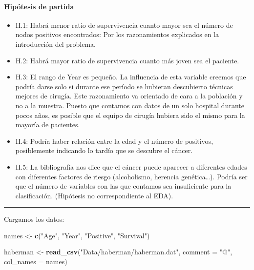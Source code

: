 \documentclass[
]{article}
\newenvironment{Shaded}{\begin{snugshade}}{\end{snugshade}}
\newcommand{\DataTypeTok}[1]{\textcolor[rgb]{0.13,0.29,0.53}{#1}}
\newcommand{\KeywordTok}[1]{\textcolor[rgb]{0.13,0.29,0.53}{\textbf{#1}}}
\newcommand{\NormalTok}[1]{#1}
\newcommand{\StringTok}[1]{\textcolor[rgb]{0.31,0.60,0.02}{#1}}
\providecommand{\tightlist}{%
  \setlength{\itemsep}{0pt}\setlength{\parskip}{0pt}}
\begin{document}
\hypertarget{hipuxf3tesis-de-partida}{%
\paragraph{Hipótesis de partida}\label{hipuxf3tesis-de-partida}}

\begin{itemize}
\tightlist
\item
  H.1: Habrá menor ratio de supervivencia cuanto mayor sea el número de
  nodos positivos encontrados: Por los razonamientos explicados en la
  introducción del problema.
\item
  H.2: Habrá mayor ratio de supervivencia cuanto más joven sea el
  paciente.
\item
  H.3: El rango de Year es pequeño. La influencia de esta variable
  creemos que podría darse solo si durante ese período se hubieran
  descubierto técnicas mejores de cirugía. Este razonamiento va
  orientado de cara a la población y no a la muestra. Puesto que
  contamos con datos de un solo hospital durante pocos años, es posible
  que el equipo de cirugía hubiera sido el mismo para la mayoría de
  pacientes.
\item
  H.4: Podría haber relación entre la edad y el número de positivos,
  posiblemente indicando lo tardío que se descubre el cáncer.
\item
  H.5: La bibliografía nos dice que el cáncer puede aparecer a
  diferentes edades con diferentes factores de riesgo (alcoholismo,
  herencia genética\ldots). Podría ser que el número de variables con
  las que contamos sea insuficiente para la clasificación. (Hipótesis no
  correspondiente al EDA).
\end{itemize}

\begin{center}\rule{0.5\linewidth}{0.5pt}\end{center}

Cargamos los datos:

\begin{Shaded}
\begin{Highlighting}[]
\NormalTok{names <-}\StringTok{ }\KeywordTok{c}\NormalTok{(}\StringTok{"Age"}\NormalTok{, }\StringTok{"Year"}\NormalTok{, }\StringTok{"Positive"}\NormalTok{, }\StringTok{"Survival"}\NormalTok{)}

\NormalTok{haberman <-}\StringTok{ }\KeywordTok{read_csv}\NormalTok{(}\StringTok{"Data/haberman/haberman.dat"}\NormalTok{, }\DataTypeTok{comment =} \StringTok{"@"}\NormalTok{, }\DataTypeTok{col_names =}\NormalTok{ names)}
\end{Highlighting}
\end{Shaded}
\end{document}
